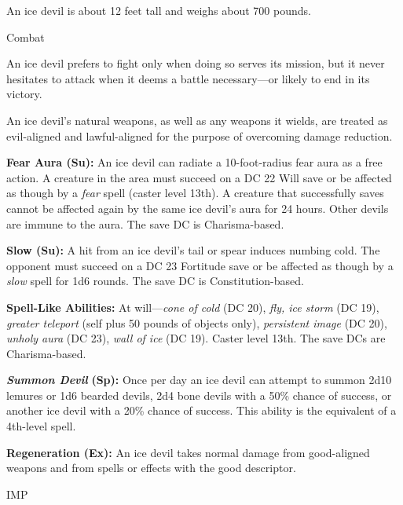 \documentclass{article}
\begin{document}
An ice devil is about 12 feet tall and weighs about 700 pounds. 

Combat

An ice devil prefers to fight only when doing so serves its mission, but it never 
hesitates to attack when it deems a battle necessary---or likely to end in its 
victory.

An ice devil's natural weapons, as well as any weapons it wields, are treated as 
evil-aligned and lawful-aligned for the purpose of overcoming damage reduction.

\textbf{Fear Aura (Su):} An ice devil can radiate a 10-foot-radius fear aura as 
a free action. A creature in the area must succeed on a DC 22 Will save or be affected 
as though by a \textit{fear }spell (caster level 13th). A creature that successfully 
saves cannot be affected again by the same ice devil's aura for 24 hours. Other 
devils are immune to the aura. The save DC is Charisma-based.

\textbf{Slow (Su): }A hit from an ice devil's tail or spear induces numbing cold. 
The opponent must succeed on a DC 23 Fortitude save or be affected as though by 
a \textit{slow }spell for 1d6 rounds. The save DC is Constitution-based.

\textbf{Spell-Like Abilities:} At will---\textit{cone of cold }(DC 20), \textit{fly, 
ice storm }(DC 19), \textit{greater teleport }(self plus 50 pounds of objects only), 
\textit{persistent image }(DC 20), \textit{unholy aura }(DC 23), \textit{wall of 
ice }(DC 19). Caster level 13th. The save DCs are Charisma-based.

\textit{\textbf{Summon Devil }}\textbf{(Sp):} Once per day an ice devil can attempt 
to summon 2d10 lemures or 1d6 bearded devils, 2d4 bone devils with a 50\% chance 
of success, or another ice devil with a 20\% chance of success. This ability is 
the equivalent of a 4th-level spell.

\textbf{Regeneration (Ex):} An ice devil takes normal damage from good-aligned 
weapons and from spells or effects with the good descriptor.

\vspace{12pt}
IMP
\end{document}
